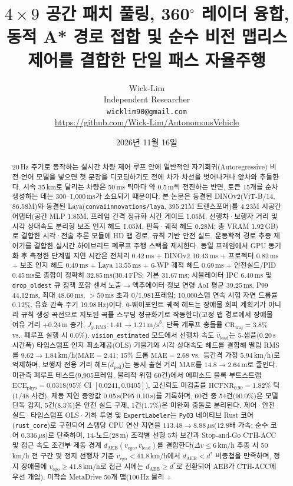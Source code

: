 \documentclass[10pt,twocolumn,a4paper]{article}
\title{\texorpdfstring{$4\times 9$}{4x9} 공간 패치 풀링, 360$^\circ$ 레이더 융합, 동적 A* 경로 접합 및 순수 비전 맵리스 제어를 결합한 단일 패스 자율주행}
\author{
  Wick-Lim \\
  Independent Researcher \\
  \texttt{wicklim90@gmail.com} \\
  \url{https://github.com/Wick-Lim/AutonomousVehicle}
}
\date{2026년 11월 16일}
\begin{document}
\maketitle

\begin{abstract}
20\,Hz 주기로 동작하는 실시간 차량 제어 루프 안에 일반적인 자기회귀(Autoregressive) 비전-언어 모델을 넣으면 첫 문장을 디코딩하기도 전에 차가 차선을 벗어나거나 앞차와 추돌한다. 시속 35\,km로 달리는 차량은 50\,ms 틱마다 약 0.5\,m씩 전진하는 반면, 토큰 15개를 순차 생성하는 데는 300--1,000\,ms가 소요되기 때문이다. 본 논문은 동결된 DINOv2(ViT-B/14, 86.58M)와 동결된 Laya(\texttt{convaiinnovations/laya}, 395.21M 트랜스포머)를 4.23M 시공간 어댑터(공간 MLP 1.85M, 프레임 간격 정규화 시간 게이트 1.05M, 선행차·보행자 거리 및 시각 상대속도 분리형 보조 인지 헤드 1.05M, 판독·궤적 헤드 0.28M; 총 VRAM 1.92\,GB)로 결합한 시각·전술 추론 모듈에 HD 맵 경로, 규칙 기반 안전 실드, 운동학적 경로 추종 제어기를 결합한 실시간 하이브리드 폐루프 주행 스택을 제시한다. 동일 프레임에서 GPU 동기화 후 측정한 단계별 지연 시간은 전처리 0.42\,ms + DINOv2 16.43\,ms + 프로젝터 0.82\,ms + 보조 인지 헤드 0.49\,ms + Laya 13.55\,ms + 6-WP 궤적 헤드 0.69\,ms + 안전실드/PID 0.45\,ms로 총합이 정확히 32.85\,ms(30.4\,FPS; 기본 31.67\,ms; 시뮬레이터 IPC 6.40\,ms 및 \texttt{drop\_oldest} 큐 정책 포함 센서 노출$\to$액추에이터 정보 연령 $\text{AoI}$ 평균 39.25\,ms, P99 44.12\,ms, 최대 48.60\,ms, $>50$\,ms 초과 0/1,981프레임; 10,000스텝 연속 시험 자연 드롭률 0.12\%, 유효 관측 주기 19.98\,Hz)이다. 6-웨이포인트 궤적 헤드는 장애물 회피 계획기가 아니라 규칙 생성 곡선으로 지도된 곡률 스무딩 정규화기로 작동한다(고정 맵 경로에서 장애물 여유 거리 $+0.24$\,m 증가, $J_{y,\text{RMS}}: 1.41\to 1.21\,\text{m/s}^3$; 단독 개루프 충돌률 $\text{CR}_{\text{traj}}=3.8\%$ vs.\ 폐루프 실행 시 $0.0\%$). \texttt{vision\_estimated} 모드에서 선행차 속도 $\hat{v}_{\text{lead}}$는 5-샘플(0.20\,s 시간폭) 타임스탬프 인지 최소제곱(OLS) 기울기와 시각 상대속도 헤드를 결합해 떨림 RMS를 $9.62\to 1.84$\,km/h($\text{MAE}=2.41$; 15\% 드롭 $\text{MAE}=2.68$ vs.\ 등간격 가정 $5.94$\,km/h)로 억제하며, 보행자 전용 거리 헤드($\hat{d}_{\text{ped}}$)는 동시 출현 거리 MAE를 $14.8\to 2.64$\,m로 줄인다. 미관측 폐루프 테스트(9,905프레임, 물리적 위험 60건)에서 에피소드 블록 부트스트랩 $\text{ECE}_{\text{phys}}=0.0318$(95\% CI $[0.0241, 0.0405]$), 고신뢰도 미검출률 $\text{HCFNR}_{0.90}=1.82\%$ 틱($1/48$ 사건), 제동 지연 중앙값 0.05\,s(P95 0.10\,s)를 기록하며, 60건 중 54건(90.0\%)은 모델 단독 감지, 5건(8.3\%)은 안전 실드 구제, 1건(1.7\%)은 미완화 충돌로 분리된다. 제어·안전실드·타임스탬프 OLS·기하 투영 및 \texttt{ExpertLabeler}는 \texttt{PyO3} 네이티브 Rust 코어(\texttt{rust\_core})로 구현되어 스텝당 CPU 연산 지연을 $113.48\to 8.88\,\mu\text{s}$($12.8$배 가속; 순수 코어 $0.336\,\mu\text{s}$)로 단축하며, 14-노드(28\,m) 조각별 선형 5차 보간과 Stop-and-Go CTH-ACC 및 접근 속도 조건부 제동 경계 $d_{\text{AEB}}(v_{\text{ego}}, v_{\text{lead}})$를 결합한다($\Delta v\le 6$\,km/h 추종 시 $50$\,km/h 전 구간 및 정지 선행차 기준 $v_{\text{ego}}<41.8$\,km/h에서 $d_{\text{AEB}}<d^*$ 비중첩을 만족하며, 정지 장애물에 $v_{\text{ego}}\ge 41.8$\,km/h로 접근 시에는 $d_{\text{AEB}}\ge d^*$로 전환되어 AEB가 CTH-ACC에 우선 개입). 미학습 MetaDrive 50개 맵($100$\,Hz 물리 + 
\end{abstract}
\end{document}
